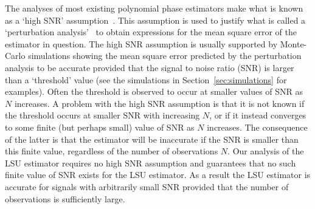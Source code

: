 \documentclass[journal]{IEEEtran}
\begin{document}
The analyses of most existing polynomial phase estimators make what is known as a `high SNR' assumption~\cite{Peleg_linear_FM,Oshea_cpf_2004,Djurovic_haf_cpf_2012,Djuric_phase_unwrap_chirp_1990,Barbarossa_analysis_of_PPS_1997,Barbarossa_PHAF_1998}.  %
This assumption is used to justify what is called a `perturbation analysis'~%
to obtain expressions for the mean square error of the estimator in question.  The high SNR assumption is usually supported by Monte-Carlo simulations showing the mean square error predicted by the perturbation analysis to be accurate provided that the signal to noise ratio (SNR) is larger than a `threshold' value (see the simulations in Section~\ref{sec:simulations} for examples).  Often the threshold is observed to occur at smaller values of SNR as $N$ increases.  A problem with the high SNR assumption is that it is not known if the threshold occurs at smaller SNR with increasing $N$, or if it instead converges to some finite (but perhaps small) value of SNR as $N$ increases.  The consequence of the latter is that the estimator will be inaccurate if the SNR is smaller than this finite value, regardless of the number of observations $N$.  Our analysis of the LSU estimator requires no high SNR assumption and guarantees that no such finite value of SNR exists for the LSU estimator.  As a result the LSU estimator is accurate for signals with arbitrarily small SNR provided that the number of observations is sufficiently large.
\end{document}
